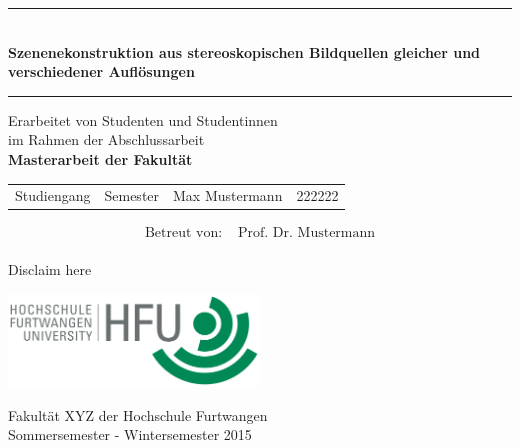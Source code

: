 \begin{titlepage}
\thispagestyle{empty}

\begin{center}
	\enlargethispage{3\baselineskip}
	\hrule
	
	\begin{center} \LARGE \textbf{\\Szenenekonstruktion aus stereoskopischen Bildquellen gleicher und verschiedener Auflösungen}
	\end{center}
	
	\vspace{0.5cm}
	
	\hrule
	
	\vspace{2.5cm}
	
	{\Large Erarbeitet von Studenten und Studentinnen\\im Rahmen der Abschlussarbeit\\[2ex]
	\textbf{Masterarbeit der Fakultät}}
	
	\vspace{3cm}
	
	\begin{tabular}{l l l l}
		Studiengang &Semester &Max Mustermann &222222 \vspace{0.2cm} \\	
	\end{tabular}
	
	\vspace{1cm}
	
	\begin{align*}
	\text{Betreut von: }  &\text{Prof. Dr. Mustermann}\\
	\end{align*}	
	
	\vspace{1.0cm}
	
	Disclaim here
	
	\vspace{1.5cm}
	\includegraphics[width=0.5\textwidth]{./images/hfu_logo.png}

	Fakultät XYZ der Hochschule Furtwangen\\[1ex]
	Sommersemester - Wintersemester 2015

\end{center}

\end{titlepage}
